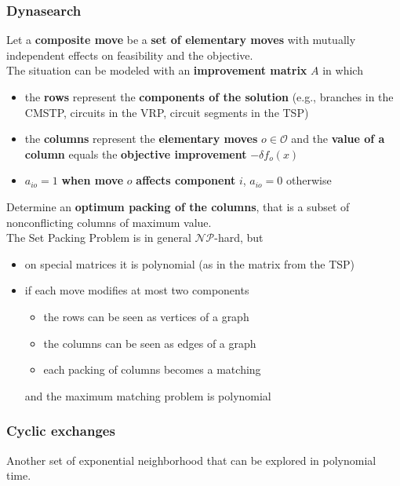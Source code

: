 \newpage

\subsubsection{Dynasearch}

Let a \textbf{composite move} be a \textbf{set of elementary moves} with mutually independent effects on feasibility and the objective.\\

The situation can be modeled with an \textbf{improvement matrix} $A$ in which 
\begin{itemize}
	\item the \textbf{rows} represent the \textbf{components of the solution} (e.g., branches in the CMSTP, circuits in the VRP, circuit segments in the TSP)
	
	\item the \textbf{columns} represent the \textbf{elementary moves} $o \in \mathcal{O}$ and the \textbf{value of a column} equals the \textbf{objective improvement} $- \delta f_o (x)$
	
	\item $a_{io} = 1$ \textbf{when move} $o$ \textbf{affects component} $i$, $a_{io} = 0$ otherwise
\end{itemize}

Determine an \textbf{optimum packing of the columns}, that is a subset of nonconflicting columns of maximum value.\\

The Set Packing Problem is in general $\mathcal{NP}$-hard, but
\begin{itemize}
	\item on special matrices it is polynomial (as in the matrix from the TSP)
	
	\item if each move modifies at most two components
	\begin{itemize}
		\item the rows can be seen as vertices of a graph
		\item the columns can be seen as edges of a graph
		\item each packing of columns becomes a matching
	\end{itemize}
	and the maximum matching problem is polynomial
\end{itemize}

\newpage

\subsubsection{Cyclic exchanges}
Another set of exponential neighborhood that can be explored in polynomial time.\\

